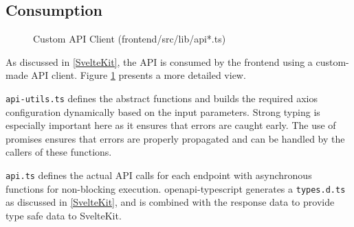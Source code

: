 \subsection{Consumption}
\begin{figure}[h]
\centering
{}
\vspace{-20pt}
\caption{Custom API Client (frontend/src/lib/api*.ts)}
\label{fig:api-lib}
\vspace{-5pt}
\end{figure}

As discussed in \ref{SvelteKit}, the API is consumed by the frontend using a custom-made API client. Figure \ref{fig:api-lib} presents a more detailed view. 

\texttt{api-utils.ts} defines the abstract functions and builds the required axios configuration dynamically based on the input parameters. Strong typing is especially important here as it ensures that errors are caught early. The use of promises ensures that errors are properly propagated and can be handled by the callers of these functions.

\texttt{api.ts} defines the actual API calls for each endpoint with asynchronous functions for non-blocking execution. openapi-typescript generates a \texttt{types.d.ts} as discussed in \ref{SvelteKit}, and is combined with the response data to provide type safe data to SvelteKit.


